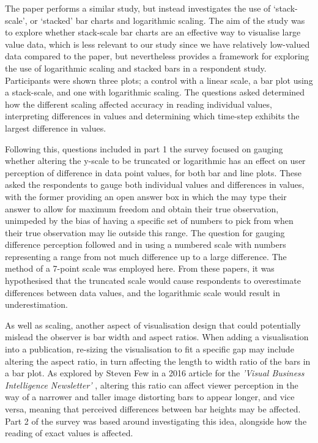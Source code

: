 \documentclass[
  12pt,
  twocolumn]{book}
\begin{document}
The paper \citet{stackscale} performs a similar study, but instead
investigates the use of `stack-scale', or `stacked' bar charts and
logarithmic scaling. The aim of the study was to explore whether
stack-scale bar charts are an effective way to visualise large value
data, which is less relevant to our study since we have relatively
low-valued data compared to the paper, but nevertheless provides a
framework for exploring the use of logarithmic scaling and stacked bars
in a respondent study. Participants were shown three plots; a control
with a linear scale, a bar plot using a stack-scale, and one with
logarithmic scaling. The questions asked determined how the different
scaling affected accuracy in reading individual values, interpreting
differences in values and determining which time-step exhibits the
largest difference in values.

Following this, questions included in part 1 the survey focused on
gauging whether altering the y-scale to be truncated or logarithmic has
an effect on user perception of difference in data point values, for
both bar and line plots. These asked the respondents to gauge both
individual values and differences in values, with the former providing
an open answer box in which the may type their answer to allow for
maximum freedom and obtain their true observation, unimpeded by the bias
of having a specific set of numbers to pick from when their true
observation may lie outside this range. The question for gauging
difference perception followed \citet{claire-obrian} and
\citet{YANG2021} in using a numbered scale with numbers representing a
range from not much difference up to a large difference. The
\citet{YANG2021} method of a 7-point scale was employed here. From these
papers, it was hypothesised that the truncated scale would cause
respondents to overestimate differences between data values, and the
logarithmic scale would result in underestimation.

As well as scaling, another aspect of visualisation design that could
potentially mislead the observer is bar width and aspect ratios. When
adding a visualisation into a publication, re-sizing the visualisation
to fit a specific gap may include altering the aspect ratio, in turn
affecting the length to width ratio of the bars in a bar plot. As
explored by Steven Few in a 2016 article for the
\textit{'Visual Business Intelligence Newsletter'} \citep{Few2016},
altering this ratio can affect viewer perception in the way of a
narrower and taller image distorting bars to appear longer, and vice
versa, meaning that perceived differences between bar heights may be
affected. Part 2 of the survey was based around investigating this idea,
alongside how the reading of exact values is affected.
\end{document}
